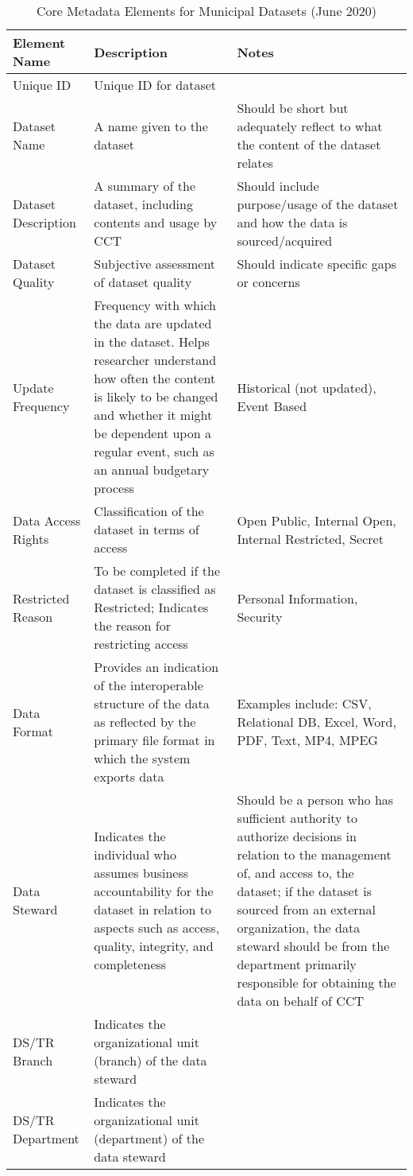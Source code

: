 \begin{table}

\caption{\label{tab:cctapptabdata}Core Metadata Elements for Municipal Datasets (June 2020)}
\centering
\begin{tabulary}{\ourtablewidth}{lLL}
\toprule
Element Name & Description & Notes\\
\midrule
Unique ID & Unique ID for dataset & \\
Dataset Name & A name given to the dataset & Should be short but adequately reflect to what the content of the dataset relates\\
Dataset Description & A summary of the dataset, including contents and usage by CCT & Should include purpose/usage of the dataset and how the data is sourced/acquired\\
Dataset Quality & Subjective assessment of dataset quality & Should indicate specific gaps or concerns\\
Update Frequency & Frequency with which the data are updated in the dataset. Helps researcher understand how often the content is likely to be changed and whether it might be dependent upon a regular event, such as an annual budgetary process & Historical (not updated), Event Based\\
\addlinespace
Data Access Rights & Classification of the dataset in terms of access & Open Public, Internal Open, Internal Restricted, Secret\\
Restricted Reason & To be completed if the dataset is classified as Restricted; Indicates the reason for restricting access & Personal Information, Security\\
Data Format & Provides an indication of the interoperable structure of the data as reflected by the primary file format in which the system exports data & Examples include: CSV, Relational DB, Excel, Word, PDF, Text, MP4, MPEG\\
Data Steward & Indicates the individual who assumes business accountability for the dataset in relation to aspects such as access, quality, integrity, and completeness & Should be a person who has sufficient authority to authorize decisions in relation to the management of, and access to, the dataset; if the dataset is sourced from an external organization, the data steward should be from the department primarily responsible for obtaining the data on behalf of CCT\\
DS/TR Branch & Indicates the organizational unit (branch) of the data steward & \\
\addlinespace
DS/TR Department & Indicates the organizational unit (department) of the data steward & \\

\end{tabulary}
\end{table}
